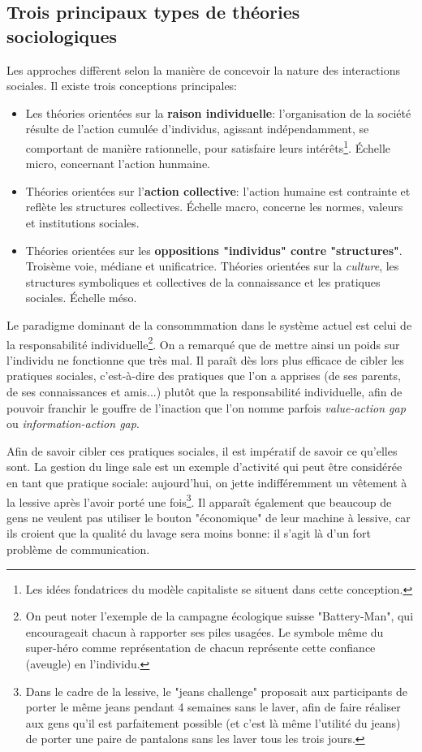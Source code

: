 \documentclass{article}
\begin{document}
\subsection{Trois principaux types de théories sociologiques}
Les approches diffèrent selon la manière de concevoir la nature des interactions sociales. Il existe trois conceptions principales:
\begin{itemize}
	\item Les théories orientées sur la \textbf{raison individuelle}: l'organisation de la société résulte de l'action cumulée d'individus, agissant indépendamment, se comportant de manière rationnelle, pour satisfaire leurs intérêts\footnote{Les idées fondatrices du modèle capitaliste se situent dans cette conception.}. Échelle micro, concernant l'action hunmaine.
	\item Théories orientées sur l'\textbf{action collective}: l'action humaine est contrainte et reflète les structures collectives. Échelle macro, concerne les normes, valeurs et institutions sociales.
	\item Théories orientées sur les \textbf{oppositions "individus" contre "structures"}. Troisème voie, médiane et unificatrice. Théories orientées sur la \emph{culture}, les structures symboliques et collectives de la connaissance et les pratiques sociales. Échelle méso. 
\end{itemize}
 Le paradigme dominant de la consommmation dans le système actuel est celui de la responsabilité individuelle\footnote{On peut noter l'exemple de la campagne écologique suisse "Battery-Man", qui encourageait chacun à rapporter ses piles usagées. Le symbole même du super-héro comme représentation de chacun représente cette confiance (aveugle) en l'individu.}. On a remarqué que de mettre ainsi un poids sur l'individu ne fonctionne que très mal. Il paraît dès lors plus efficace de cibler les pratiques sociales, c'est-à-dire des pratiques que l'on a apprises (de ses parents, de ses connaissances et amis...) plutôt que la responsabilité individuelle, afin de pouvoir franchir le gouffre de l'inaction que l'on nomme parfois \emph{value-action gap} ou \emph{information-action gap}. \par
 Afin de savoir cibler ces pratiques sociales, il est impératif de savoir ce qu'elles sont. La gestion du linge sale est un exemple d'activité qui peut être considérée en tant que pratique sociale: aujourd'hui, on jette indifféremment un vêtement à la lessive après l'avoir porté une fois\footnote{Dans le cadre de la lessive, le "jeans challenge" proposait aux participants de porter le même jeans pendant 4 semaines sans le laver, afin de faire réaliser aux gens qu'il est parfaitement possible (et c'est là même l'utilité du jeans) de porter une paire de pantalons sans les laver tous les trois jours.}. Il apparaît également que beaucoup de gens ne veulent pas utiliser le bouton "économique" de leur machine à lessive, car ils croient que la qualité du lavage sera moins bonne: il s'agit là d'un fort problème de communication. \par
\end{document}
